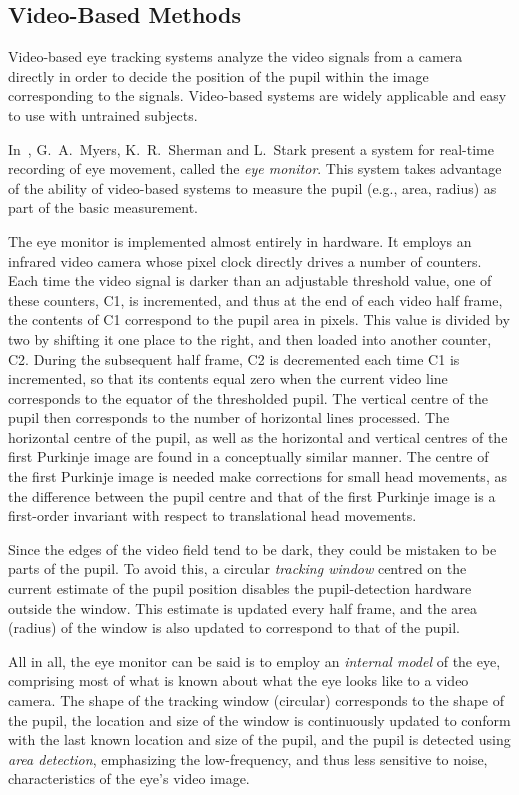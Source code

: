 \subsection{Video-Based Methods}
\label{back:track:monitor}

Video-based eye tracking systems analyze the video signals from a
camera directly in order to decide the position of the pupil within
the image corresponding to the signals.  Video-based systems are
widely applicable and easy to use with untrained subjects.

In~\cite{monitor}, G.\ A.\ Myers, K.\ R.\ Sherman and L.\ Stark
present a system for real-time recording of eye movement, called the
{\em eye monitor\/}.  This system takes advantage of the ability of
video-based systems to measure the pupil (e.g., area, radius) as part
of the basic measurement.

The eye monitor is implemented almost entirely in hardware.  It
employs an infrared video camera whose pixel clock directly drives a
number of counters.  Each time the video signal is darker than an
adjustable threshold value, one of these counters, C1, is incremented,
and thus at the end of each video half frame, the contents of C1
correspond to the pupil area in pixels.  This value is divided by two
by shifting it one place to the right, and then loaded into another
counter, C2.  During the subsequent half frame, C2 is decremented each
time C1 is incremented, so that its contents equal zero when the
current video line corresponds to the equator of the thresholded
pupil.  The vertical centre of the pupil then corresponds to the
number of horizontal lines processed.  The horizontal centre of the
pupil, as well as the horizontal and vertical centres of the first
Purkinje image are found in a conceptually similar manner.  The centre
of the first Purkinje image is needed make corrections for small head
movements, as the difference between the pupil centre and that of the
first Purkinje image is a first-order invariant with respect to
translational head movements.

Since the edges of the video field tend to be dark, they could be
mistaken to be parts of the pupil.  To avoid this, a circular {\em
  tracking window\/} centred on the current estimate of the pupil
position disables the pupil-detection hardware outside the window.
This estimate is updated every half frame, and the area (radius) of
the window is also updated to correspond to that of the pupil.

All in all, the eye monitor can be said is to employ an {\em internal
  model\/} of the eye, comprising most of what is known about what the
eye looks like to a video camera.  The shape of the tracking window
(circular) corresponds to the shape of the pupil, the location and
size of the window is continuously updated to conform with the last
known location and size of the pupil, and the pupil is detected using
{\em area detection\/}, emphasizing the low-frequency, and thus less
sensitive to noise, characteristics of the eye's video image.

